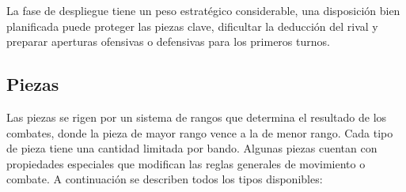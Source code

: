 La fase de despliegue tiene un peso estratégico considerable, una disposición bien planificada puede proteger las piezas clave, dificultar la deducción del rival y preparar aperturas ofensivas o defensivas para los primeros turnos.

\subsection{Piezas}

Las piezas se rigen por un sistema de rangos que determina el resultado de los combates, donde la pieza de mayor rango vence a la de menor rango. Cada tipo de pieza tiene una cantidad limitada por bando. Algunas piezas cuentan con propiedades especiales que modifican las reglas generales de movimiento o combate. A continuación se describen todos los tipos disponibles:

